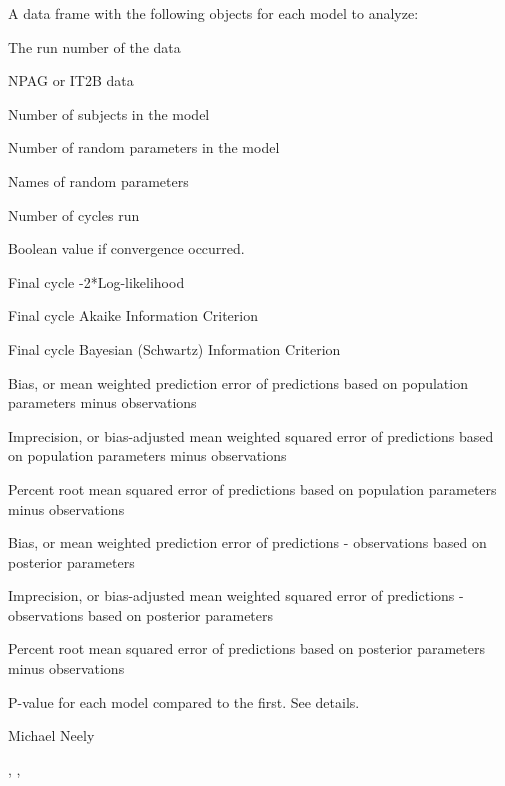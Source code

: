 \documentclass[a4paper]{book}
\begin{document}
\begin{Value}
A data frame with the following objects for each model to analyze:
\begin{ldescription}
\item[\code{run }] The run number of the data
\item[\code{type }] NPAG or IT2B data
\item[\code{nsub }] Number of subjects in the model
\item[\code{nvar }] Number of random parameters in the model
\item[\code{par }] Names of random parameters
\item[\code{cycles }] Number of cycles run
\item[\code{converge }] Boolean value if convergence occurred.
\item[\code{ll }] Final cycle -2*Log-likelihood 
\item[\code{aic }] Final cycle Akaike Information Criterion
\item[\code{bic }] Final cycle Bayesian (Schwartz) Information Criterion 
\item[\code{popBias }] Bias, or mean weighted prediction error of predictions based on population parameters minus observations
\item[\code{popImp }] Imprecision, or bias-adjusted mean weighted squared error of predictions based on population parameters minus observations 
\item[\code{popPerRMSE}] Percent root mean squared error of predictions based on population parameters minus observations
\item[\code{postBias }] Bias, or mean weighted prediction error of predictions - observations  based on posterior parameters
\item[\code{postImp }] Imprecision, or bias-adjusted mean weighted squared error of predictions - observations based on posterior parameters
\item[\code{postPerRMSE}] Percent root mean squared error of predictions based on posterior parameters minus observations
\item[\code{pval }] P-value for each model compared to the first. See details.
\end{ldescription}
\end{Value}
%
\begin{Author}\relax
Michael Neely
\end{Author}
%
\begin{SeeAlso}\relax
{}, , 
\end{SeeAlso}
\end{document}
